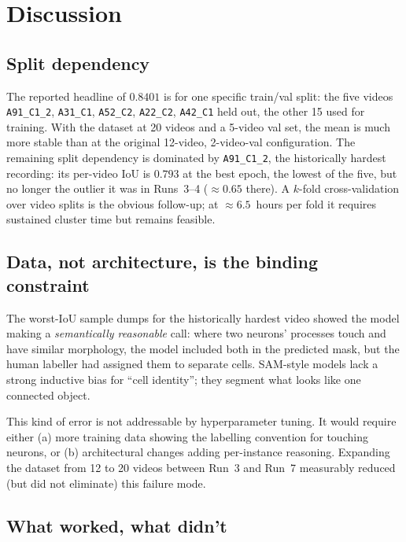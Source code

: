 \documentclass[11pt,a4paper]{article}
\begin{document}
\section{Discussion}
\label{sec:limitations}

\subsection{Split dependency}

The reported headline of $0.8401$ is for one specific train/val
split: the five videos
\texttt{A91\_C1\_2}, \texttt{A31\_C1}, \texttt{A52\_C2},
\texttt{A22\_C2}, \texttt{A42\_C1} held out, the other 15 used for
training. With the dataset at 20 videos and a 5-video val set, the
mean is much more stable than at the original 12-video, 2-video-val
configuration. The remaining split dependency is dominated by
\texttt{A91\_C1\_2}, the historically hardest recording: its per-video
IoU is $0.793$ at the best epoch, the lowest of the five, but no
longer the outlier it was in Runs~3--4 ($\approx 0.65$ there). A
$k$-fold cross-validation over video splits is the obvious follow-up;
at $\approx 6.5$~hours per fold it requires sustained cluster time
but remains feasible.

\subsection{Data, not architecture, is the binding constraint}

The worst-IoU sample dumps for the historically hardest video
showed the model making a \emph{semantically reasonable} call: where
two neurons' processes touch and have similar morphology, the model
included both in the predicted mask, but the human labeller had
assigned them to separate cells. SAM-style models lack a strong
inductive bias for ``cell identity''; they segment what looks like
one connected object.

This kind of error is not addressable by hyperparameter tuning. It
would require either (a) more training data showing the labelling
convention for touching neurons, or (b) architectural changes adding
per-instance reasoning. Expanding the dataset from 12 to 20 videos
between Run~3 and Run~7 measurably reduced (but did not eliminate)
this failure mode.

\subsection{What worked, what didn't}
\end{document}
